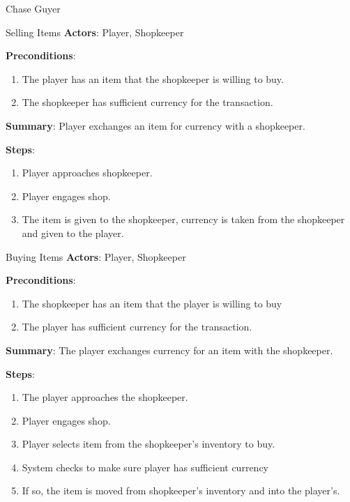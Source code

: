 \documentclass[12pt]{report}
\begin{document}
\begin{section}{Chase Guyer}

\begin{subsection}{Selling Items}
\textbf{Actors}:
Player, Shopkeeper

\textbf{Preconditions}:
\begin{enumerate}
\item The player has an item that the shopkeeper is willing to buy.
\item The shopkeeper has sufficient currency for the transaction.
\end{enumerate}

\textbf{Summary}:
Player exchanges an item for currency with a shopkeeper.

\textbf{Steps}:
\begin{enumerate}
\item Player approaches shopkeeper.
\item Player engages shop.
\item The item is given to the shopkeeper, currency is taken from the shopkeeper
and given to the player.
\end{enumerate}

\end{subsection}

\begin{subsection}{Buying Items}
\textbf{Actors}:
Player, Shopkeeper

\textbf{Preconditions}:
\begin{enumerate}
\item The shopkeeper has an item that the player is willing to buy
\item The player has sufficient currency for the transaction.
\end{enumerate}

\textbf{Summary}:
The player exchanges currency for an item with the shopkeeper.

\textbf{Steps}:
\begin{enumerate}
\item The player approaches the shopkeeper.
\item Player engages shop.
\item Player selects item from the shopkeeper's inventory to buy.
\item System checks to make sure player has sufficient currency
\item If so, the item is moved from shopkeeper's inventory and into the player's.
\end{enumerate}


\end{subsection}
\end{section}
\end{document}
